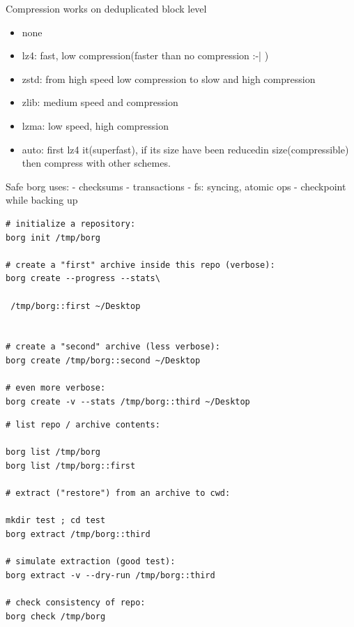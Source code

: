 \documentclass{beamer}
\begin{document}
\begin{frame}{Compression}
	works on deduplicated block level
\begin{itemize}
	\item none
	\item lz4: fast, low compression(faster than no compression :-| )
	\item zstd: from high speed low compression to slow and high compression 
	\item zlib: medium speed and compression
	\item lzma: low speed, high compression
	\item auto: first lz4 it(superfast), if its  size have been reducedin size(compressible) then compress with other schemes.
\end{itemize}
\end{frame}

\begin{frame}{Safe} 
	borg uses:
	- checksums
	- transactions
	- fs: syncing, atomic ops
	- checkpoint while backing up
\end{frame}

\begin{frame}[fragile]
	\begin{lstlisting}[backgroundcolor = \color{black},
		basicstyle=\color{lightgray}
			language = bash,
			framexleftmargin = 1em]
# initialize a repository:
borg init /tmp/borg

# create a "first" archive inside this repo (verbose): 
borg create --progress --stats\

 /tmp/borg::first ~/Desktop


# create a "second" archive (less verbose):
borg create /tmp/borg::second ~/Desktop

# even more verbose:
borg create -v --stats /tmp/borg::third ~/Desktop
\end{lstlisting}
\end{frame}

\begin{frame}[fragile]
	\begin{lstlisting}[backgroundcolor = \color{black},
		basicstyle=\color{lightgray}
		language = bash,
		framexleftmargin = 1em]
# list repo / archive contents:

borg list /tmp/borg
borg list /tmp/borg::first

# extract ("restore") from an archive to cwd:

mkdir test ; cd test
borg extract /tmp/borg::third

# simulate extraction (good test):
borg extract -v --dry-run /tmp/borg::third

# check consistency of repo:
borg check /tmp/borg
\end{lstlisting}
\end{frame}
\end{document}
